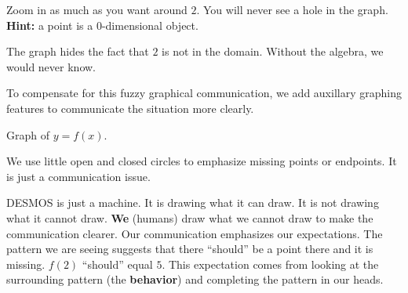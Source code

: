 \documentclass{ximera}
\begin{document}
Zoom in as much as you want around $2$. You will never see a hole in the graph.   \\
\textbf{Hint:} a point is a $0$-dimensional object. 

\begin{center}
\end{center}

The graph hides the fact that $2$ is not in the domain.  Without the algebra, we would never know.

To compensate for this fuzzy graphical communication, we add auxillary graphing features to communicate the situation more clearly.



Graph of $y = f(x)$.

\begin{image}
\end{image}


We use little open and closed circles to emphasize missing points or endpoints.  It is just a communication issue. 




DESMOS is just a machine. It is drawing what it can draw.  It is not drawing what it cannot draw. \textbf{We} (humans) draw what we cannot draw to make the communication clearer. Our communication emphasizes our expectations. The pattern we are seeing suggests that there ``should'' be a point there and it is missing. $f(2)$ ``should'' equal $5$.  This expectation comes from looking at the surrounding pattern (the \textbf{\textcolor{purple!85!blue}{behavior}}) and completing the pattern in our heads. 
\end{document}
